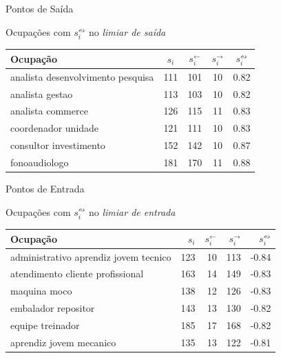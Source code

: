 \documentclass[10pt, hyperref={pdfpagelabels=false}]{beamer}
\newcommand{\linkin}[1]{#1^\leftarrow} %
\newcommand{\linkout}[1]{#1^\rightarrow} %
\newcommand{\recboth}[1]{#1^\leftrightsquigarrow} %
\begin{document}
\begin{frame}[label=hipotese-ponto-de-saida-tabela]{Pontos de Saída}
  \begin{center}
    Ocupações com $\recboth{s_i}$ no \textit{limiar de saída}
    
    \vspace{\baselineskip}
    
    \begin{tabular}{l|c|c|c|c}
      \hline
      Ocupação & $s_i$ & $\linkin{s_i}$ & $\linkout{s_i}$ & $\recboth{s_i}$\\
      \hline
      analista desenvolvimento pesquisa & 111 & 101 & 10 & 0.82\\
      \hline
      analista gestao & 113 & 103 & 10 & 0.82\\
      \hline
      analista commerce & 126 & 115 & 11 & 0.83\\
      \hline
      coordenador unidade & 121 & 111 & 10 & 0.83\\
      \hline
      consultor investimento & 152 & 142 & 10 & 0.87\\
      \hline
      fonoaudiologo & 181 & 170 & 11 & 0.88\\
      \hline
    \end{tabular}
  \end{center}
\end{frame}


\begin{frame}[label=hipotese-ponto-de-entrada-tabela]{Pontos de Entrada}
  \begin{center}
    Ocupações com $\recboth{s_i}$ no \textit{limiar de entrada}
    
    \vspace{\baselineskip}
    
    \begin{tabular}{l|r|r|r|r}
      \hline
      Ocupação & $s_i$ & $\linkin{s_i}$ & $\linkout{s_i}$ & $\recboth{s_i}$\\
      \hline
      administrativo aprendiz jovem tecnico & 123 & 10 & 113 & -0.84\\
      \hline
      atendimento cliente profissional & 163 & 14 & 149 & -0.83\\
      \hline
      maquina moco & 138 & 12 & 126 & -0.83\\
      \hline
      embalador repositor & 143 & 13 & 130 & -0.82\\
      \hline
      equipe treinador & 185 & 17 & 168 & -0.82\\
      \hline
      aprendiz jovem mecanico & 135 & 13 & 122 & -0.81\\
      \hline
    \end{tabular}
  \end{center}
\end{frame}
\end{document}
